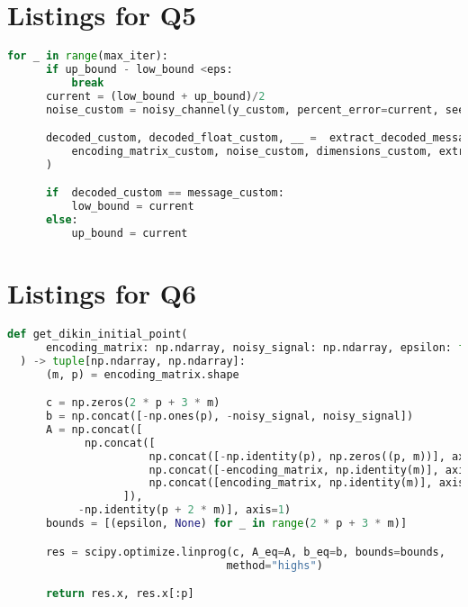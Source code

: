 \documentclass{article}
\begin{document}
\section{Listings for Q5}

\begin{lstlisting}[language=Python, caption={Binary search used to determine maximum level of noise up to what the message can be decrypted. \textit{extract\_fn} is either \textit{extract\_message\_geometric} or \textit{extract\_message\_standard}}, label={lst:bin}]
  for _ in range(max_iter):
      if up_bound - low_bound <eps:
          break
      current = (low_bound + up_bound)/2
      noise_custom = noisy_channel(y_custom, percent_error=current, seed=seed)

      decoded_custom, decoded_float_custom, __ =  extract_decoded_message(
          encoding_matrix_custom, noise_custom, dimensions_custom, extract_fn
      )

      if  decoded_custom == message_custom:
          low_bound = current
      else:
          up_bound = current
\end{lstlisting}


\newpage

\section{Listings for Q6}

\begin{lstlisting}[language=Python, caption={Extraction of dirty initial point for Dikin's method using standard form of linear optimization problem}, label={lst:dikin_init}]
  def get_dikin_initial_point(
      encoding_matrix: np.ndarray, noisy_signal: np.ndarray, epsilon: float
  ) -> tuple[np.ndarray, np.ndarray]:
      (m, p) = encoding_matrix.shape

      c = np.zeros(2 * p + 3 * m)
      b = np.concat([-np.ones(p), -noisy_signal, noisy_signal])
      A = np.concat([
            np.concat([
                      np.concat([-np.identity(p), np.zeros((p, m))], axis=1),
                      np.concat([-encoding_matrix, np.identity(m)], axis=1),
                      np.concat([encoding_matrix, np.identity(m)], axis=1),
                  ]),
           -np.identity(p + 2 * m)], axis=1)
      bounds = [(epsilon, None) for _ in range(2 * p + 3 * m)]

      res = scipy.optimize.linprog(c, A_eq=A, b_eq=b, bounds=bounds,
                                  method="highs")

      return res.x, res.x[:p]
\end{lstlisting}
\end{document}
